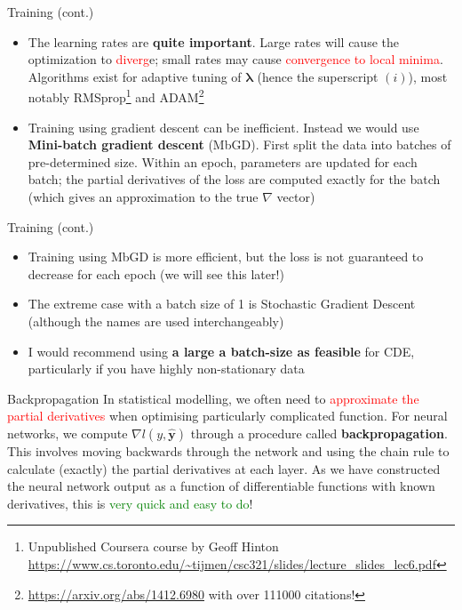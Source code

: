 \documentclass{beamer}
\begin{document}
\begin{frame}{Training (cont.)}
\begin{itemize}
\item The learning rates are \textbf{quite important}. Large rates will cause the optimization to \textcolor{red}{diverg}e; small rates may cause \textcolor{red}{convergence to local minima}. Algorithms exist for adaptive tuning of $\boldsymbol{\lambda}$ (hence the superscript $(i)$), most notably RMSprop\footnote{Unpublished Coursera course by Geoff Hinton \url{https://www.cs.toronto.edu/~tijmen/csc321/slides/lecture_slides_lec6.pdf}} and ADAM\footnote{\url{https://arxiv.org/abs/1412.6980} with over 111000 citations!}
\item Training using gradient descent can be inefficient. Instead we would use \textbf{Mini-batch gradient descent} (MbGD). First split the data into batches of pre-determined size. Within an epoch, parameters are updated for each batch; the partial derivatives of the loss are computed exactly for the batch (which gives an approximation to the true $\nabla$ vector) 
\end{itemize} 
\end{frame}
\begin{frame}{Training (cont.)}
\begin{itemize}
\item Training using MbGD is more efficient, but the loss is not guaranteed to decrease for each epoch (we will see this later!)
\item The extreme case with a batch size of 1 is Stochastic Gradient Descent (although the names are used interchangeably)
\item I would recommend using \textbf{a large a batch-size as feasible} for CDE, particularly if you have highly non-stationary data
\end{itemize} 
\end{frame}
\begin{frame}{Backpropagation}
In statistical modelling, we often need to \textcolor{red}{approximate the partial derivatives} when optimising particularly complicated function. For neural networks, we compute $\nabla l(y,\hat{\mathbf{y}})$ through a procedure called \textbf{backpropagation}. This involves moving backwards through the network and using the chain rule to calculate (exactly) the partial derivatives at each layer. As we have constructed the neural network output as a function of differentiable functions with known derivatives, this is \textcolor{green}{very quick and easy to do}!
\end{frame}
\end{document}
